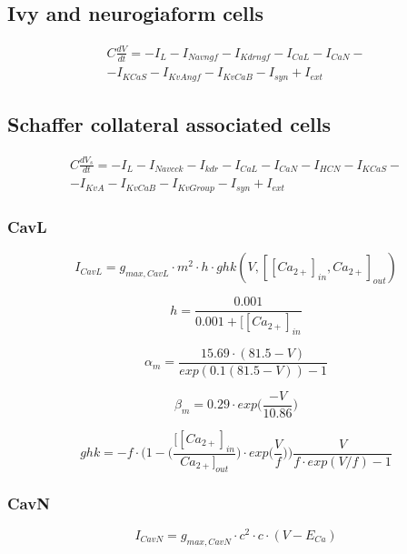 \documentclass[12pt]{article}
\begin{document}
\subsection{Ivy and neurogiaform cells}
\begin{eqnarray}
C\frac{dV}{dt}=-I_L-I_{Navngf}-I_{Kdrngf} - I_{CaL}-I_{CaN}- \nonumber \\
-I_{KCaS} -I_{KvAngf}-I_{KvCaB}-I_{syn} + I_{ext}
\end{eqnarray}

\subsection{Schaffer collateral associated cells}
\begin{eqnarray}
C\frac{dV_s}{dt}=-I_L-I_{Navcck}-I_{kdr}-I_{CaL}-I_{CaN}-I_{HCN}-I_{KCaS}- \nonumber \\ -I_{KvA}-I_{KvCaB}-I_{KvGroup}-I_{syn} + I_{ext}
\end{eqnarray}

\subsubsection{CavL}
\begin{equation}
I_{CavL} = g_{max, CavL} \cdot m^2 \cdot h \cdot ghk(V, [[Ca_{2+}]_{in}, Ca_{2+}]_{out} )
\end{equation}

\begin{equation}
h = \frac{0.001}{0.001 +[[Ca_{2+}]_{in} }
\end{equation}

\begin{equation}
\alpha_{m} = \frac{15.69 \cdot (81.5-V)}{exp(0.1(81.5-V)) - 1}
\end{equation}

\begin{equation}
\beta_{m} = 0.29 \cdot exp \Big(\frac{-V}{10.86}\Big)
\end{equation}

\begin{equation}
ghk = -f \cdot \Big(1 - \Big(\frac{[[Ca_{2+}]_{in}}{Ca_{2+}]_{out}} \Big) \cdot exp \Big(\frac{V}{f}\Big) \Big) \frac{V}{f \cdot exp(V/f) -1 }
\end{equation}

\subsubsection{CavN}
\begin{equation}
I_{CavN} = g_{max, CavN} \cdot c^2 \cdot c \cdot (V - E_{Ca})
\end{equation}
\end{document}
